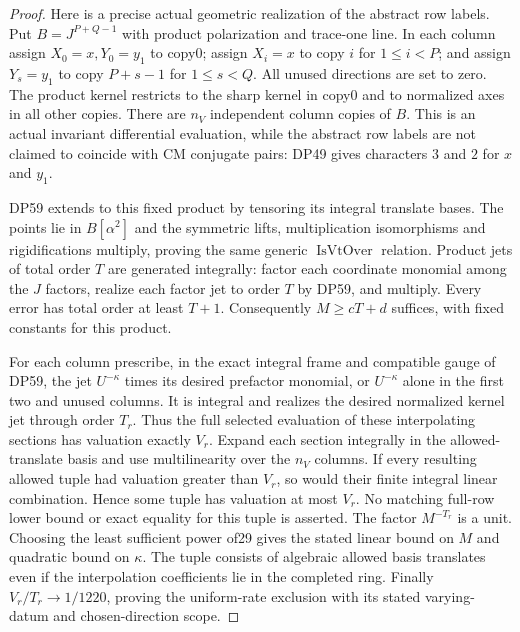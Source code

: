 \begin{proof}
Here is a precise actual geometric realization of the abstract row
labels. Put $B=J^{P+Q-1}$ with product polarization and trace-one line.
In each column assign $X_0=x,Y_0=y_1$ to copy0; assign $X_i=x$ to
copy $i$ for $1\le i<P$; and assign $Y_s=y_1$ to copy $P+s-1$ for
$1\le s<Q$. All unused directions are set to zero. The product kernel
restricts to the sharp kernel in copy0 and to normalized axes in all
other copies. There are $n_V$ independent column copies of $B$.
This is an actual invariant differential evaluation, while the abstract
row labels are not claimed to coincide with CM conjugate pairs:
DP49 gives characters $3$ and $2$ for $x$ and $y_1$.

DP59 extends to this fixed product by tensoring its integral translate
bases. The points lie in $B[\alpha^2]$ and the symmetric lifts,
multiplication isomorphisms and rigidifications multiply, proving the
same generic $\operatorname{IsVtOver}$ relation. Product jets of total
order $T$ are generated integrally: factor each coordinate monomial
among the $J$ factors, realize each factor jet to order $T$ by DP59,
and multiply. Every error has total order at least $T+1$.
Consequently $M\ge cT+d$ suffices, with fixed constants for this product.

For each column prescribe, in the exact integral frame and compatible
gauge of DP59, the jet $U^{-\kappa}$ times its desired prefactor
monomial, or $U^{-\kappa}$ alone in the first two and unused columns.
It is integral and realizes the desired normalized kernel jet through
order $T_r$. Thus the full selected evaluation of these interpolating
sections has valuation exactly $V_r$. Expand each section integrally
in the allowed-translate basis and use multilinearity over the $n_V$
columns. If every resulting allowed tuple had valuation greater than
$V_r$, so would their finite integral linear combination. Hence some
tuple has valuation at most $V_r$. No matching full-row lower bound or
exact equality for this tuple is asserted. The factor $M^{-T_r}$ is a
unit. Choosing the least sufficient power of29 gives the stated
linear bound on $M$ and quadratic bound on $\kappa$.
The tuple consists of algebraic allowed basis translates even if the
interpolation coefficients lie in the completed ring.
Finally $V_r/T_r\to1/1220$, proving the uniform-rate exclusion with
its stated varying-datum and chosen-direction scope.
\end{proof}
